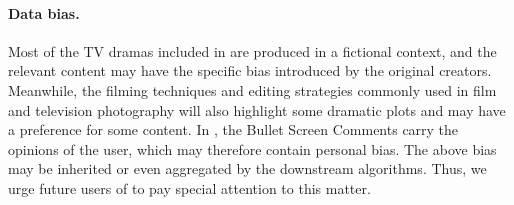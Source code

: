 \paragraph{Data bias.}
Most of the TV dramas included in \TVD are produced in a fictional context, and the relevant content may have the specific bias introduced by the original creators.
Meanwhile, the filming techniques and editing strategies commonly used in film and television photography will also highlight some dramatic plots and may have a preference for some content.
In \TVD,  the Bullet Screen Comments carry the opinions of the user, which may therefore contain personal bias.
The above bias may be inherited or even aggregated by the downstream algorithms.
Thus, we urge future users of \TVD to pay special  attention to this matter.

